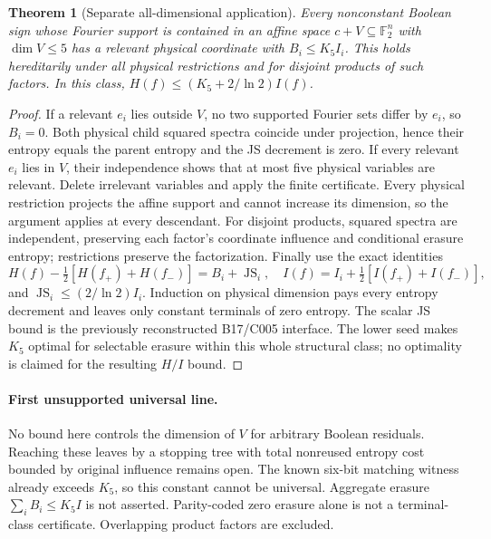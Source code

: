\documentclass{article}
\newtheorem{theorem}{Theorem}
\begin{document}
\begin{theorem}[Separate all-dimensional application]
Every nonconstant Boolean sign whose Fourier support is contained in an affine
space $c+V\subseteq\mathbb F_2^n$ with $\dim V\le5$ has a relevant physical
coordinate with $B_i\le K_5 I_i$. This holds hereditarily under all physical
restrictions and for disjoint products of such factors. In this class,
$H(f)\le(K_5+2/\ln2)I(f)$.
\end{theorem}
\begin{proof}
If a relevant $e_i$ lies outside $V$, no two supported Fourier sets differ by
$e_i$, so $B_i=0$. Both physical child squared spectra coincide under projection,
hence their entropy equals the parent entropy and the JS decrement is zero.
If every relevant $e_i$ lies in $V$, their independence shows that at most five
physical variables are relevant. Delete irrelevant variables and apply the
finite certificate. Every physical restriction projects the affine support
and cannot increase its dimension, so the argument applies at every descendant.
For disjoint products, squared spectra are independent, preserving each factor's
coordinate influence and conditional erasure entropy; restrictions preserve
the factorization. Finally use the exact identities
\[
 H(f)-\tfrac12[H(f_+)+H(f_-)]=B_i+\operatorname{JS}_i,
 \quad I(f)=I_i+\tfrac12[I(f_+)+I(f_-)],
\]
and $\operatorname{JS}_i\le(2/\ln2)I_i$. Induction on physical dimension
pays every entropy decrement and leaves only constant terminals of zero entropy.
The scalar JS bound is the previously reconstructed B17/C005 interface.
The lower seed makes $K_5$ optimal for selectable erasure within this whole
structural class; no optimality is claimed for the resulting $H/I$ bound.
\end{proof}

\paragraph{First unsupported universal line.}
No bound here controls the dimension of $V$ for arbitrary Boolean residuals.
Reaching these leaves by a stopping tree with total nonreused entropy cost
bounded by original influence remains open. The known six-bit matching witness
already exceeds $K_5$, so this constant cannot be universal. Aggregate erasure
$\sum_iB_i\le K_5 I$ is not asserted. Parity-coded zero erasure alone is not
a terminal-class certificate. Overlapping product factors are excluded.
\end{document}

